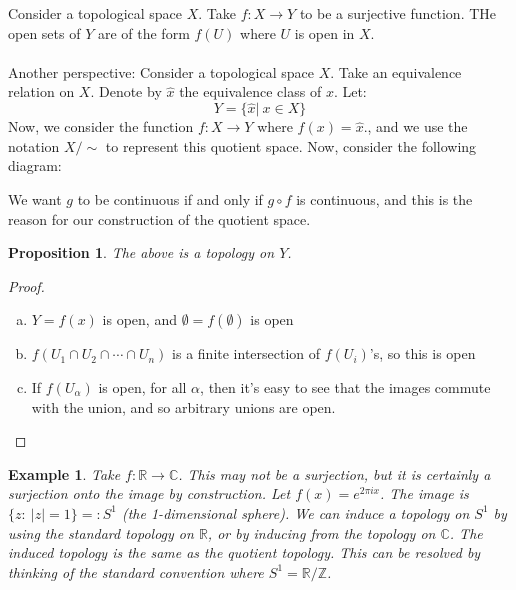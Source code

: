 \documentclass{article}
\newcommand{\R}{\mathbb{R}}
\newcommand{\C}{\mathbb{C}}
\newcommand{\Z}{\mathbb{Z}}
\newtheorem{example}{Example}
\newtheorem{proposition}{Proposition}
\begin{document}
Consider a topological space $X$. Take $f:X\rightarrow Y$ to be a surjective function. THe open sets of $Y$ are of the form $f(U)$ where $U$ is open in $X$.\\
\\
Another perspective: Consider a topological space $X$. Take an equivalence relation on $X$. Denote by $\hat{x}$ the equivalence class of $x$. Let:
$$Y=\{\hat{x}|\ x\in X\}$$
Now, we consider the function $f:X\rightarrow Y$ where $f(x)=\hat{x}$., and we use the notation $X/\sim$ to represent this quotient space. Now, consider the following diagram:
\begin{center}
\end{center}
We want $g$ to be continuous if and only if $g\circ f$ is continuous, and this is the reason for our construction of the quotient space.
\begin{proposition}
The above is a topology on $Y$.
\end{proposition}
\begin{proof}
\begin{enumerate}[(a)]
    \item $Y=f(x)$ is open, and $\emptyset=f(\emptyset)$ is open
    \item $f(U_1\cap U_2\cap\cdots\cap U_n)$ is a finite intersection of $f(U_i)$'s, so this is open
    \item If $f(U_\alpha)$ is open, for all $\alpha$, then it's easy to see that the images commute with the union, and so arbitrary unions are open.
\end{enumerate}
\end{proof}
\begin{example}
Take $f:\R\rightarrow\C$. This may not be a surjection, but it is certainly a surjection onto the image by construction. Let $f(x)=e^{2\pi ix}$. The image is $\{z:\ |z|=1\}=: S^1$ (the 1-dimensional sphere). We can induce a topology on $S^1$ by using the standard topology on $\R$, or by inducing from the topology on $\C$. The induced topology is the same as the quotient topology. This can be resolved by thinking of the standard convention where $S^1=\R/\Z$.
\end{example}
\end{document}
